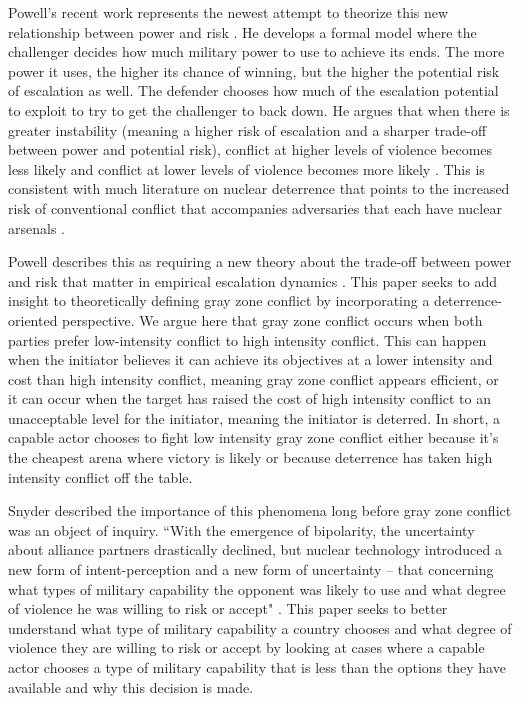\documentclass[12pt,letterpaper]{article}
\begin{document}
		Powell's recent work represents the newest attempt to theorize this new relationship between power and risk \citep{powell_nuclearbrinkmanshiplimited_2015}. He develops a formal model where the challenger decides how much military power to use to achieve its ends. The more power it uses, the higher its chance of winning, but the higher the potential risk of escalation as well. The defender chooses how much of the escalation potential to exploit to try to get the challenger to back down. He argues that when there is greater instability (meaning a higher risk of escalation and a sharper trade-off between power and potential risk), conflict at higher levels of violence becomes less likely and conflict at lower levels of violence becomes more likely \citep{powell_nuclearbrinkmanshiplimited_2015}. This is consistent with much literature on nuclear deterrence that points to the increased risk of conventional conflict that accompanies adversaries that each have nuclear arsenals \citep{sagan_spreadnuclearweapons_2003, kapur_dangerousdeterrentnuclear_2007, russell_nuclearpeacefallacy_2003}.
		
		Powell describes this as requiring a new theory about the trade-off between power and risk that matter in empirical escalation dynamics \citep{powell_nuclearbrinkmanshiplimited_2015}. This paper seeks to add insight to theoretically defining gray zone conflict by incorporating a deterrence-oriented perspective. We argue here that gray zone conflict occurs when both parties prefer low-intensity conflict to high intensity conflict. This can happen when the initiator believes it can achieve its objectives at a lower intensity and cost than high intensity conflict, meaning gray zone conflict appears efficient, or it can occur when the target has raised the cost of high intensity conflict to an unacceptable level for the initiator, meaning the initiator is deterred. In short, a capable actor chooses to fight low intensity gray zone conflict either because it's the cheapest arena where victory is likely or because deterrence has taken high intensity conflict off the table.
		
		Snyder described the importance of this phenomena long before gray zone conflict was an object of inquiry. ``With the emergence of bipolarity, the uncertainty about alliance partners drastically declined, but nuclear technology introduced a new form of intent-perception and a new form of uncertainty -- that concerning what types of military capability the opponent was likely to use and what degree of violence he was willing to risk or accept" \citep{snyder_balancepowerbalance_1967}. This paper seeks to better understand what type of military capability a country chooses and what degree of violence they are willing to risk or accept by looking at cases where a capable actor chooses a type of military capability that is less than the options they have available and why this decision is made.
\end{document}
